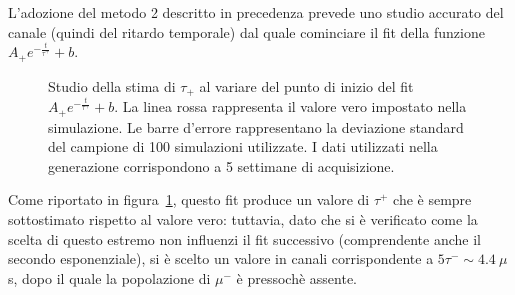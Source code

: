 \documentclass[10pt, oneside, a4paper]{article}   	%
\begin{document}
L'adozione del metodo 2 descritto in precedenza prevede uno studio accurato del canale (quindi del ritardo temporale) dal quale cominciare il fit della funzione $A_+e^{-\frac{t}{\tau^+}}+b$. 
%
\begin{figure}[b!]
  \centerline{}
  \caption{Studio della stima di $\tau_+$ al variare del punto di inizio del fit $A_+e^{-\frac{t}{\tau^+}}+b$. La linea rossa rappresenta il valore vero impostato nella simulazione. Le barre d'errore rappresentano la deviazione standard del campione di 100 simulazioni utilizzate. I dati utilizzati nella generazione corrispondono a 5 settimane di acquisizione.}
  \label{fig::tauplusstart}
\end{figure}
%
Come riportato in figura~\ref{fig::tauplusstart}, questo fit produce un valore di $\tau^+$ che è sempre sottostimato rispetto al valore vero: tuttavia, dato che si è verificato come la scelta di questo estremo non influenzi il fit successivo (comprendente anche il secondo esponenziale), si è scelto un valore in canali corrispondente a $5\tau^-\sim4.4\ \mu$s, dopo il quale la popolazione di $\mu^-$ è pressochè assente.
\end{document}
